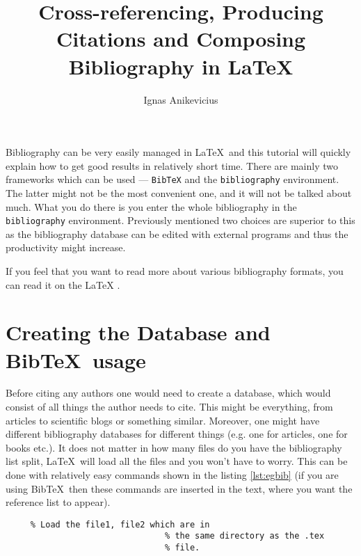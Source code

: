 

\usepackage[printonlyused]{acronym}

\title{Cross-referencing, Producing Citations and Composing Bibliography in \LaTeX{}}
\author{Ignas Anikevicius}
\date{}



\maketitle

Bibliography can be very easily managed in \LaTeX\ and this tutorial will
quickly explain how to get good results in relatively short time.  There are
mainly two frameworks which can be used --- \verb|BibTeX| and the
\verb|bibliography| environment. The latter might not be the most convenient
one, and it will not be talked about much. What you do there is you enter
the whole bibliography in the \verb|bibliography| environment. Previously
mentioned two choices are superior to this as the bibliography database can
be edited with external programs and thus the productivity might increase.

If you feel that you want to read more about various bibliography formats,
you can read it on the LaTeX
.\cite{latexwikibook:bibliography}

\tableofcontents

\section{Creating the Database and Bib\TeX\ usage}

Before citing any authors one would need to create a database, which would
consist of all things the author needs to cite. 
%
This might be everything, from articles to scientific blogs or something
similar. 
%
Moreover, one might have different bibliography databases for different things
(e.g. one for articles, one for books etc.). 
%
It does not matter in how many files do you have the bibliography list split,
\LaTeX\ will load all the files and you won't have to worry. 
%
This can be done with relatively easy commands shown in the listing
\ref{lst:egbib} (if you are using Bib\TeX\ then these commands are inserted in
the text, where you want the reference list to appear).
%
\begin{lstlisting}[caption={Example code to get BibTeX working},label=lst:egbib]
       % Load the plain style
     % Load the file1, file2 which are in
                                % the same directory as the .tex
                                % file.
\end{lstlisting}



